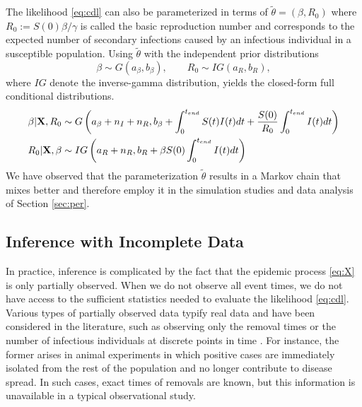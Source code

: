 \documentclass[11pt]{article}
\begin{document}
	The likelihood \eqref{eq:cdl} can also be parameterized in terms of $\tilde{\theta} = (\beta, R_0)$ where $R_0 := S(0) \beta / \gamma$ is called the basic reproduction number and corresponds to the expected number of secondary infections caused by an infectious individual in a susceptible population. Using $\tilde{\theta}$ with the independent prior distributions
	\begin{equation}
		\label{eq:pri2}
		\beta \sim G(a_{\beta}, b_{\beta}), \qquad R_0 \sim IG(a_{R}, b_{R}),
	\end{equation}
	where $IG$ denote the inverse-gamma distribution, yields the closed-form full conditional distributions.
	\begin{align}		\label{eq:posterior_theta2}
		\beta | \mathbf{X}, R_0 & \sim G\left( a_{\beta} + n_I + n_R, b_{\beta} + \int_{0}^{t_{end}} S(t)I(t) dt + \frac{S(0)}{R_0} \int_{0}^{t_{end}} I(t) dt\right) \\
		R_0 | \mathbf{X}, \beta & \sim IG\left( a_{R} + n_R, b_{R} + \beta S(0) \int_{0}^{t_{end}} I(t) dt\right)
	\end{align}
	We have observed that the parameterization $\tilde{\theta}$ results in a Markov chain that mixes better and therefore employ it in the simulation studies and data analysis of Section \eqref{sec:per}.
	
	


	
	\subsection{Inference with Incomplete Data}
	\label{sec:iid}
	
	In practice, inference is complicated by the fact that the epidemic process \eqref{eq:X} is only partially observed. When we do not observe all event times, we do not have access to the sufficient statistics needed to evaluate the likelihood \eqref{eq:cdl}. Various types of partially observed data typify real data and have been considered in the literature, such as observing only the removal times \cite{Gibson.1998, ONeill.1999} or the number of infectious individuals at discrete points in time \cite{Fintzi.2017}. For instance, the former arises in animal experiments in which positive cases are immediately isolated from the rest of the population and no longer contribute to disease spread. In such cases, exact times of removals are known, but this information is unavailable in a typical observational study.
	
\end{document}
